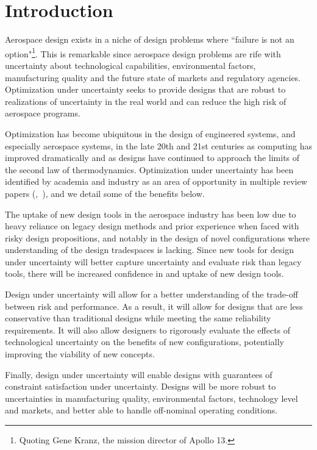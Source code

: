 \section{Introduction}

Aerospace design exists in a niche of design problems where ``failure is
not an option"\footnote{Quoting Gene Kranz, the mission director of Apollo 13.}.
This is remarkable since aerospace design problems are rife with uncertainty about
technological capabilities, environmental factors, manufacturing quality and the future
state of markets and regulatory agencies.
Optimization under uncertainty seeks to provide designs that are robust
to realizations of uncertainty in the real world and can reduce
the high risk of aerospace programs.

Optimization has become ubiquitous in the design of engineered systems, and especially aerospace systems,
in the late 20th and 21st centuries as computing has improved dramatically and as designs have
continued to approach the limits of the second law of thermodynamics. Optimization under uncertainty
has been identified by academia and industry as an area of opportunity
in multiple review papers (\cite{Zang2002},~\cite{Yao2011}),
and we detail some of the benefits below.

{\color{blue} The uptake of new design tools in the aerospace industry has been low
due to heavy reliance on legacy design methods and prior experience when
faced with risky design propositions, and notably in
the design of novel configurations where understanding
of the design tradespaces is lacking. Since new tools for design under uncertainty
will better capture uncertainty and evaluate risk than legacy tools,
there will be increased confidence in and uptake of new design tools.

Design under uncertainty will allow for a better understanding of the trade-off between risk and
performance. As a result, it will allow for designs that are less conservative than
traditional designs while meeting the same reliability requirements. It will also allow
designers to rigorously evaluate the effects of
technological uncertainty on the benefits of new configurations,
potentially improving the viability of new concepts.

Finally, design under uncertainty will enable designs with guarantees
of constraint satisfaction under uncertainty. Designs
will be more robust to uncertainties in manufacturing quality,
environmental factors, technology level and markets, and better able to
handle off-nominal operating conditions.}

